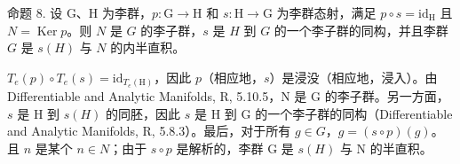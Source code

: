 命题 8. 设 G、H 为李群，\(p: \mathrm{G} \to \mathrm{H}\) 和 \(s: \mathrm{H} \to \mathrm{G}\) 为李群态射，满足 \(p \circ s = \mathrm{id}_{\mathrm{H}}\) 且 \(N = \operatorname{Ker} p\)。则 \(N\) 是 \(G\) 的李子群，\(s\) 是 \(H\) 到 \(G\) 的一个李子群的同构，并且李群 \(G\) 是 \(s(H)\) 与 \(N\) 的内半直积。

\(T_{e}(p) \circ T_{e}(s) = \mathrm{id}_{T_{e}(\mathrm{H})}\)，因此 \(p\)（相应地，\(s\)）是浸没（相应地，浸入）。由 Differentiable and Analytic Manifolds, R, 5.10.5，N 是 G 的李子群。另一方面，\(s\) 是 H 到 \(s(H)\) 的同胚，因此 \(s\) 是 H 到 G 的一个李子群的同构（Differentiable and Analytic Manifolds, R, 5.8.3）。最后，对于所有 \(g \in G\)，\(g = (s \circ p)(g)\)。且 \(n\) 是某个 \(n \in N\)；由于 \(s \circ p\) 是解析的，李群 G 是 \(s(H)\) 与 N 的半直积。

